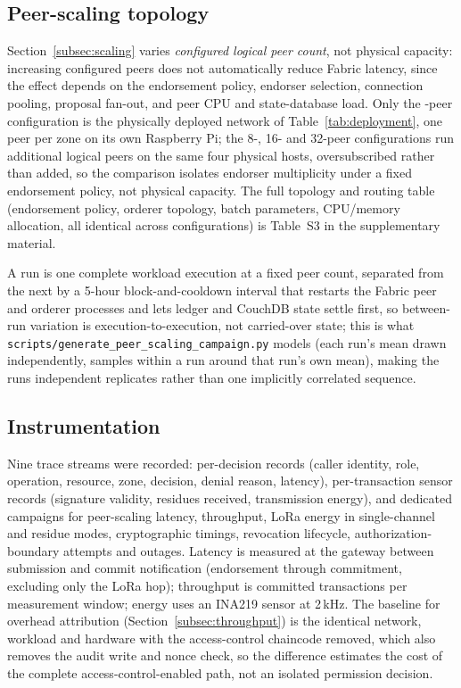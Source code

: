 \documentclass[a4paper,fleqn]{cas-sc}
\begin{document}
\subsection{Peer-scaling topology}
\label{subsec:topology}

Section~\ref{subsec:scaling} varies \emph{configured logical peer count},
not physical capacity: increasing configured peers does not automatically
reduce Fabric latency, since the effect depends on the endorsement policy,
endorser selection, connection pooling, proposal fan-out, and peer CPU and
state-database load. Only the \ScaleMinPeers-peer configuration is the
physically deployed network of Table~\ref{tab:deployment}, one peer per
zone on its own Raspberry Pi; the \num{8}-, \num{16}- and \num{32}-peer
configurations run additional logical peers on the same four physical
hosts, oversubscribed rather than added, so the comparison isolates
endorser multiplicity under a fixed endorsement policy, not physical
capacity. The full topology and routing table (endorsement policy,
orderer topology, batch parameters, CPU/memory allocation, all identical
across configurations) is Table~S3 in the supplementary material.

A run is one complete workload execution at a fixed peer count, separated
from the next by a 5-hour block-and-cooldown interval that restarts the
Fabric peer and orderer processes and lets ledger and CouchDB state
settle first, so between-run variation is execution-to-execution, not
carried-over state; this is what
\texttt{scripts/generate\_peer\_scaling\_campaign.py} models (each run's
mean drawn independently, samples within a run around that run's own
mean), making the runs independent replicates rather than one implicitly
correlated sequence.

\subsection{Instrumentation}
\label{subsec:instrumentation}

Nine trace streams were recorded: per-decision records (caller identity,
role, operation, resource, zone, decision, denial reason, latency),
per-transaction sensor records (signature validity, residues received,
transmission energy), and dedicated campaigns for peer-scaling latency,
throughput, LoRa energy in single-channel and residue modes,
cryptographic timings, revocation lifecycle, authorization-boundary
attempts and outages. Latency is measured at the gateway between
submission and commit notification (endorsement through commitment,
excluding only the LoRa hop); throughput is committed transactions per
measurement window; energy uses an INA219 sensor at 2\,kHz. The baseline
for overhead attribution (Section~\ref{subsec:throughput}) is the
identical network, workload and hardware with the access-control
chaincode removed, which also removes the audit write and nonce check, so
the difference estimates the cost of the complete access-control-enabled
path, not an isolated permission decision.
\end{document}
